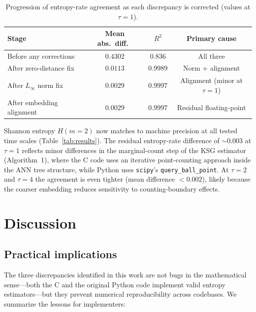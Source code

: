 \documentclass[12pt,a4paper]{article}
\begin{document}
\begin{table}[t]
\centering
\caption{Progression of entropy-rate agreement as each discrepancy is corrected (values at $\tau = 1$).}\label{tab:before_after}
\begin{tabular}{@{}lccc@{}}
\toprule
Stage & Mean abs.\ diff.\ & $R^2$ & Primary cause \\
\midrule
Before any corrections & $0.4302$ & $0.836$ & All three \\
After zero-distance fix & $0.0113$ & $0.9989$ & Norm + alignment \\
After $L_\infty$ norm fix & $0.0029$ & $0.9997$ & Alignment (minor at $\tau{=}1$) \\
After embedding alignment & $0.0029$ & $0.9997$ & Residual floating-point \\
\bottomrule
\end{tabular}
\end{table}

Shannon entropy $H(m{=}2)$ now matches to machine precision at all tested time scales (Table~\ref{tab:results}).
The residual entropy-rate difference of ${\sim}0.003$ at $\tau = 1$ reflects minor differences in the marginal-count step of the KSG estimator (Algorithm~1), where the C code uses an iterative point-counting approach inside the ANN tree structure, while Python uses \texttt{scipy}'s \texttt{query\_ball\_point}.
At $\tau = 2$ and $\tau = 4$ the agreement is even tighter (mean difference $< 0.002$), likely because the coarser embedding reduces sensitivity to counting-boundary effects.


\section{Discussion}\label{sec:discussion}

\subsection{Practical implications}

The three discrepancies identified in this work are not bugs in the mathematical sense---both the C and the original Python code implement valid entropy estimators---but they prevent numerical reproducibility across codebases.
We summarize the lessons for implementers:
\end{document}
